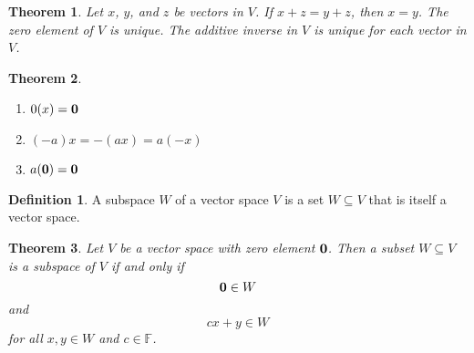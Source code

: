 \documentclass[oneside, 12pt]{book}
\newtheorem{thm}{Theorem}[section]
\theoremstyle{definition}
\newtheorem{defn}{Definition}[section]
\begin{document}
\begin{thm}
  \label{thm_canc}
  Let $x$, $y$, and $z$ be vectors in $V$. If $x+z=y+z$, then $x=y$.
  The zero element of $V$ is unique.
  The additive inverse in $V$ is unique for each vector in $V$.
\end{thm}
\begin{thm}
\label{thm_alg}

\begin{enumerate}
  \item $0(x)=\bold{0}$
  \item $(-a)x=-(ax)=a(-x)$
  \item $a(\bold{0})=\bold{0}$
\end{enumerate}

\end{thm}
\begin{defn}
\label{defn_subspace}
  A subspace $W$ of a vector space $V$ is a set $W \subseteq V$ that is itself a vector space.
\end{defn}
\begin{thm}
\label{thm_subspace}
  Let $V$ be a vector space with zero element $\bold{0}$. Then a subset $W \subseteq V$
  is a subspace of $V$ if and only if \[\bold{0} \in W\] and \[cx+y \in W\] for all $x,y \in W$ and $c \in \mathbb{F}$.
\end{thm}
\end{document}
